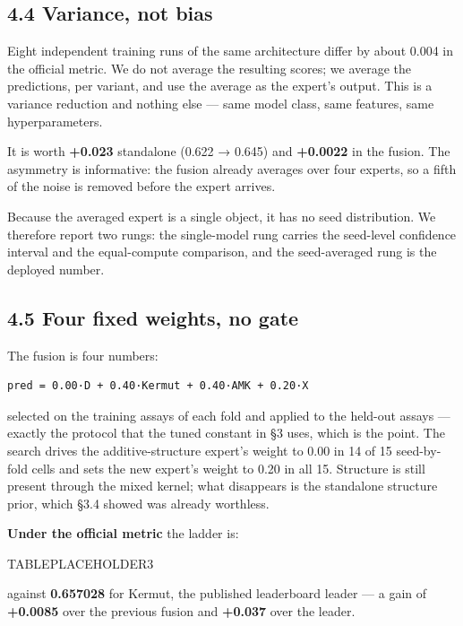 \hypertarget{variance-not-bias}{%
\subsection{4.4 Variance, not bias}\label{variance-not-bias}}

Eight independent training runs of the same architecture differ by about 0.004 in the official metric.
We do not average the resulting scores; we average the predictions, per variant, and use the average as
the expert's output. This is a variance reduction and nothing else --- same model class, same features,
same hyperparameters.

It is worth \textbf{+0.023} standalone (0.622 → 0.645) and \textbf{+0.0022} in the fusion. The asymmetry is
informative: the fusion already averages over four experts, so a fifth of the noise is removed before
the expert arrives.

Because the averaged expert is a single object, it has no seed distribution. We therefore report two
rungs: the single-model rung carries the seed-level confidence interval and the equal-compute
comparison, and the seed-averaged rung is the deployed number.

\hypertarget{four-fixed-weights-no-gate}{%
\subsection{4.5 Four fixed weights, no gate}\label{four-fixed-weights-no-gate}}

The fusion is four numbers:

\begin{verbatim}
pred = 0.00·D + 0.40·Kermut + 0.40·AMK + 0.20·X
\end{verbatim}

selected on the training assays of each fold and applied to the held-out assays --- exactly the protocol
that the tuned constant in §3 uses, which is the point. The search drives the additive-structure
expert's weight to 0.00 in 14 of 15 seed-by-fold cells and sets the new expert's weight to 0.20 in all
15. Structure is still present through the mixed kernel; what disappears is the standalone structure
prior, which §3.4 showed was already worthless.

\textbf{Under the official metric} the ladder is:

TABLEPLACEHOLDER3

against \textbf{0.657028} for Kermut, the published leaderboard leader --- a gain of \textbf{+0.0085} over the
previous fusion and \textbf{+0.037} over the leader.

